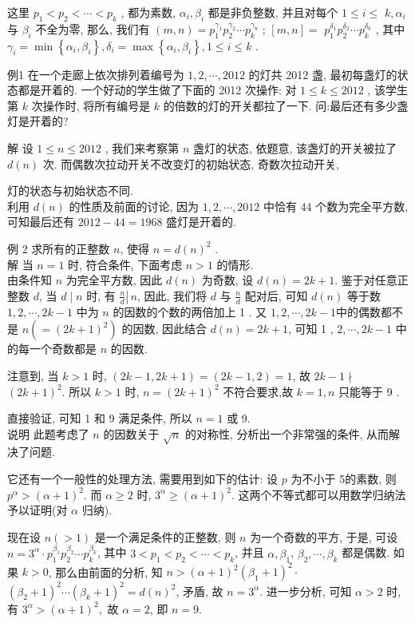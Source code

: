 这里 $p_{1}<p_{2}<\cdots<p_{k}$ , 都为素数,  $\alpha_{i} ,  \beta_{i}$ 都是非负整数, 并且对每个 $1 \leqslant i \leqslant$ $k, \alpha_{i}$ 与 $\beta_{i}$ 不全为零, 那么, 我们有 $(m, n)=p_{1}^{\gamma_{1}} p_{2}^{\gamma_{2}} \cdots p_{k}^{\gamma_{k}}$ ;  $[m, n]=$ $p_{1}^{\delta_{1}} p_{2}^{\delta_{2}} \cdots p_{k}^{\delta_{k}}$ , 其中 $\gamma_{i}=\min \left\{\alpha_{i}, \beta_{i}\right\}, \delta_{i}=\max \left\{\alpha_{i}, \beta_{i}\right\}, 1 \leqslant i \leqslant k$ .

例1 在一个走廊上依次排列着编号为 $1,2, \cdots, 2012$ 的灯共 2012 盏, 最初每盏灯的状态都是开着的. 一个好动的学生做了下面的 2012 次操作: 对 $1 \leqslant k \leqslant 2012$ , 该学生第 $k$ 次操作时, 将所有编号是 $k$ 的倍数的灯的开关都拉了一下. 问:最后还有多少盏灯是开着的?

解 设 $1 \leqslant n \leqslant 2012$ , 我们来考察第 $n$ 盏灯的状态, 依题意, 该盏灯的开关被拉了 $d(n)$ 次. 而偶数次拉动开关不改变灯的初始状态, 奇数次拉动开关,

灯的状态与初始状态不同.\\
利用 $d(n)$ 的性质及前面的讨论, 因为 $1,2, \cdots, 2012$ 中恰有 44 个数为完全平方数, 可知最后还有 $2012-44=1968$ 盛灯是开着的.

例 2 求所有的正整数 $n$, 使得 $n=d(n)^{2}$ . \\
解 当 $n=1$ 时, 符合条件, 下面考虑 $n>1$ 的情形.\\
由条件知 $n$ 为完全平方数, 因此 $d(n)$ 为奇数, 设 $d(n)=2 k+1$. 鉴于对任意正整数 $d$, 当 $d \mid n$ 时, 有 $\left.\frac{n}{d} \right\rvert\, n$, 因此, 我们将 $d$ 与 $\frac{n}{d}$ 配对后, 可知 $d(n)$ 等于数 $1,2, \cdots, 2 k-1$ 中为 $n$ 的因数的个数的两倍加上 1 . 又 $1,2, \cdots, 2 k-1$中的偶数都不是 $n\left(=(2 k+1)^{2}\right)$ 的因数, 因此结合 $d(n)=2 k+1$, 可知 1 , $2, \cdots, 2 k-1$ 中的每一个奇数都是 $n$ 的因数.

注意到, 当 $k>1$ 时, $(2 k-1,2 k+1)=(2 k-1,2)=1$, 故 $2 k-1 \nmid$ $(2 k+1)^{2}$. 所以 $k>1$ 时, $n=(2 k+1)^{2}$ 不符合要求,故 $k=1, n$ 只能等于 9 .

直接验证, 可知 1 和 9 满足条件, 所以 $n=1$ 或 9.\\
说明 此题考虑了 $n$ 的因数关于 $\sqrt{n}$ 的对称性, 分析出一个非常强的条件, 从而解决了问题.

它还有一个一般性的处理方法, 需要用到如下的估计: 设 $p$ 为不小于 5的素数, 则 $p^{\alpha}>(\alpha+1)^{2}$. 而 $\alpha \geqslant 2$ 时, $3^{\alpha} \geqslant(\alpha+1)^{2}$. 这两个不等式都可以用数学归纳法予以证明(对 $\alpha$ 归纳).

现在设 $n(>1)$ 是一个满足条件的正整数, 则 $n$ 为一个奇数的平方, 于是, 可设 $n=3^{\alpha} \cdot p_{1}^{\beta_{1}} p_{2}^{\beta_{2}} \cdots p_{k}^{\beta_{k}}$, 其中 $3<p_{1}<p_{2}<\cdots<p_{k}$, 并且 $\alpha, \beta_{1}$, $\beta_{2}, \cdots, \beta_{k}$ 都是偶数. 如果 $k>0$, 那么由前面的分析, 知 $n>(\alpha+1)^{2}\left(\beta_{1}+1\right)^{2} \cdot$ $\left(\beta_{2}+1\right)^{2} \cdots\left(\beta_{k}+1\right)^{2}=d(n)^{2}$, 矛盾, 故 $n=3^{\alpha}$. 进一步分析, 可知 $\alpha>2$ 时, 有 $3^{\alpha}>(\alpha+1)^{2} , $ 故 $\alpha=2$, 即 $n=9$.

